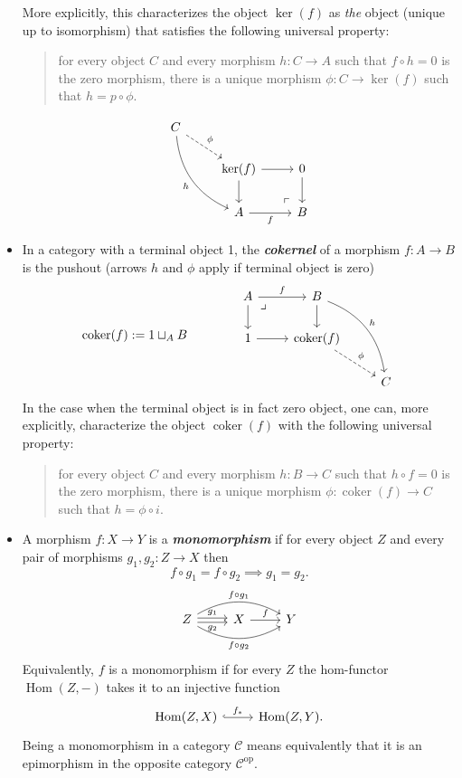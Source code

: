 \documentclass{article}
\newcommand{\Cc}{\mathcal{C}}
\DeclareMathOperator{\Hom}{Hom}
\DeclareMathOperator{\op}{op}
\DeclareMathOperator{\coker}{coker}
\begin{document}
\begin{defn}
\begin{itemize}
		More explicitly, this characterizes the object $\ker(f)$ as \textit{the} object (unique up to isomorphism) that satisfies the following universal property:
		\begin{quote}
			for every object $C$ and every morphism $h:C\to A$ such that $f\circ h=0$ is the zero morphism, there is a unique morphism $\phi:C\to\ker(f)$ such that $h=p\circ\phi$.
		\end{quote}
		\[\begin{tikzcd}
			C\arrow[dr,dashed,"\phi"]\arrow[ddr,bend right,swap,"h"]\\
			&\ker(f)\arrow[d]\arrow[r]&0\arrow[d]\\
			&A\arrow[r,"f",swap]&B\arrow[ul, phantom, "\ulcorner", very near start]
		\end{tikzcd}\]
		\item In a category with a terminal object 1, the \textbf{\textit{cokernel}} of a morphism $f:A\to B$ is the pushout (arrows $h$ and $\phi$ apply if terminal object is zero)
		\[\coker(f):=1\sqcup_AB\qquad\qquad\begin{tikzcd}
			A\arrow[r,"f"]\arrow[d]\arrow[dr, phantom, "\lrcorner", very near start]&B\arrow[d]\arrow[rdd,bend left,"h"]\\
			1\arrow[r]&\coker(f)\arrow[dr,dashed,"\phi"]\\
			&&C
		\end{tikzcd}\]
		In the case when the terminal object is in fact zero object, one can, more explicitly, characterize the object $\coker(f)$ with the following universal property:
		\begin{quote}
			for every object $C$ and every morphism $h:B\to C$ such that $h\circ f=0$ is the zero morphism, there is a unique morphism $\phi:\coker(f)\to C$ such that $h=\phi\circ i$.
		\end{quote}
		
		\item A morphism $f:X\to Y$ is a \textbf{\textit{monomorphism}} if for every object $Z$ and every pair of morphisms $g_1,g_2:Z\to X$ then
		\[f\circ g_1=f\circ g_2\implies g_1=g_2.\]
		\[\begin{tikzcd}
			Z\arrow[r,shift={(0,.06)},"g_1"]\arrow[r,swap,shift={(0,-.06)},"g_2"]\arrow[rr,bend left,"f\circ g_1"]\arrow[rr,bend right,swap,"f\circ g_2"]&X\arrow[r,"f"]&Y
		\end{tikzcd}\]
		Equivalently, $f$ is a monomorphism if for every $Z$ the hom-functor $\Hom(Z,-)$ takes it to an injective function
		\[\begin{tikzcd}
			\Hom(Z,X)\arrow[r,hook,"f_*"]&\Hom(Z,Y).
		\end{tikzcd}\]
		Being a monomorphism in a category $\Cc$ means equivalently that it is an epimorphism in the opposite category $\Cc^{\op}$.
		

\end{itemize}
\end{defn}
\end{document}
